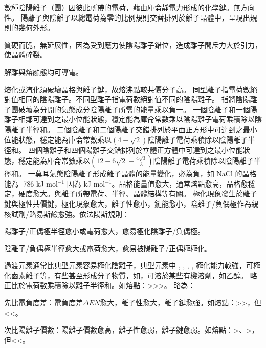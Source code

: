 \documentclass[a4paper,12pt]{report}
\begin{document}
數種陰陽離子（團）因彼此所帶的電荷，藉由庫侖靜電力形成的化學鍵。無方向性。
陽離子與陰離子以總電荷為零的比例規則交替排列於離子晶體中，呈現出規則的幾何外形。
\bit
\item 質硬而脆，無延展性，因為受到應力使陰陽離子錯位，造成離子間斥力大於引力，使晶體碎裂。
\item 解離與熔融態均可導電。
\item 熔化或汽化須破壞晶格與離子鍵，故熔沸點較共價分子高。
\eit
{}
同型離子指電荷數絕對值相同的陰陽離子。不同型離子指電荷數絕對值不同的陰陽離子。
指將陰陽離子團破壞為分開的氣態成分陰陽離子所需的能量乘以負一。
一個陰離子和一個陽離子相鄰可達到之最小位能狀態，穩定能為庫侖常數乘以陰陽離子電荷乘積除以陰陽離子半徑和。
二個陰離子和二個陽離子交錯排列於平面正方形中可達到之最小位能狀態，穩定能為庫侖常數乘以$(4-\sqrt{2})$陰陽離子電荷乘積除以陰陽離子半徑和。
四個陰離子和四個陽離子交錯排列於立體正方體中可達到之最小位能狀態，穩定能為庫侖常數乘以$(12-6\sqrt{2}+\frac{4\sqrt{3}}{3})$陰陽離子電荷乘積除以陰陽離子半徑和。
一莫耳氣態陰陽離子形成離子晶體的能量變化，必為負，如 NaCl 的晶格能為 -786 kJ mol$^{-1}$ 因為  kJ mol$^{-1}$。晶格能量值愈大，通常熔點愈高，晶格愈穩定，硬度愈大。與離子所帶電荷、半徑、晶體結構等有關。
極化現象發生於離子鍵與極性共價鍵，極化現象愈大，離子性愈小，鍵能愈小，陰離子/負偶極作為親核試劑/路易斯鹼愈強。依法陽斯規則：
\bit
\item 陽離子/正偶極半徑愈小或電荷愈大，愈易極化陰離子/負偶極。
\item 陰離子/負偶極半徑愈大或電荷愈大，愈易被陽離子/正偶極極化。
\item 過渡元素通常比典型元素容易極化陰離子，典型元素中 , , , ,  極化能力較強，可極化鹵素離子等，有些甚至形成分子物質，如，可溶於某些有機溶劑，如乙醇。
\eit
{}
略正比於電荷數乘積除以離子半徑和。如熔點：>>>。
略為：
\bit
\item 先比電負度差：電負度差$\Delta EN$愈大，離子性愈大，離子鍵愈強。如熔點：>>，但 <<。
\item 次比陽離子價數：陽離子價數愈高，離子性愈弱，離子鍵愈弱。如熔點：>、>，但<<。
\end{document}
